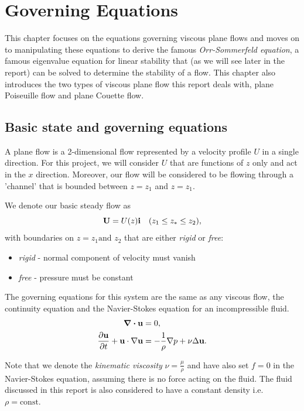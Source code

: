 \chapter{Governing Equations}
\label{chap:governing}

This chapter focuses on the equations governing viscous plane flows and moves on to manipulating these equations to derive the famous \emph{Orr-Sommerfeld equation}, a famous eigenvalue equation for linear stability that (as we will see later in the report) can be solved to determine the stability of a flow. This chapter also introduces the two types of viscous plane flow this report deals with, plane Poiseuille flow and plane Couette flow. 

\section{Basic state and governing equations}

A plane flow is a 2-dimensional flow represented by a velocity profile $ U $ in a single direction. For this project, we will consider $ U $ that are functions of $ z $ only and act in the $ x $ direction. Moreover, our flow will be considered to be flowing through a 'channel' that is bounded between $ z = z_{1} $ and $ z = z_{1} $.

We denote our basic steady flow as
\begin{equation}
    \mathbf{U} = U (z) \mathbf{i} \hspace{10px} (z_{1} \leq z_* \leq z_{2}),
\end{equation}
with boundaries on $z = z_{1} \text{and } z_{2}$ that are either \emph{rigid} or \emph{free}:
\begin{itemize}
    \item \emph{rigid} - normal component of velocity must vanish
    \item \emph{free} - pressure must be constant
\end{itemize}

The governing equations for this system are the same as any viscous flow, the continuity equation and the Navier-Stokes equation for an incompressible fluid. 
\begin{align}
    \div{\mathbf{u}} &= 0, \nonumber\\
    \pdv{\mathbf{u}}{t} + \mathbf{u} \cdot \nabla \mathbf{u} &= - \frac{1}{\rho} \nabla p + \nu \Delta \mathbf{u}.
\label{dimgoveq}
\end{align}

Note that we denote the \emph{kinematic viscosity} $ \nu = \frac{\mu}{\rho} $ and have also set $ f = 0 $ in the Navier-Stokes equation, assuming there is no force acting on the fluid. The fluid discussed in this report is also considered to have a constant density i.e. $ \rho = \text{const.} $

